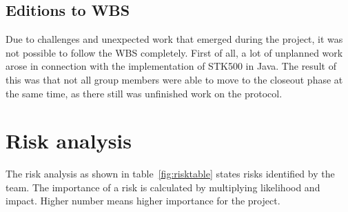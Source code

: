 \subsection{Editions to WBS}
Due to challenges and unexpected work that emerged during the project, it was not possible to follow the WBS completely. First of all, a lot of unplanned work arose in connection with the implementation of STK500 in Java. The result of this was that not all group members were able to move to the closeout phase at the same time, as there still was unfinished work on the protocol.

\section{Risk analysis}
The risk analysis as shown in table~\ref{fig:risktable} states risks identified by the team. The importance of a risk is calculated by multiplying likelihood and impact. Higher number means higher importance for the project.

